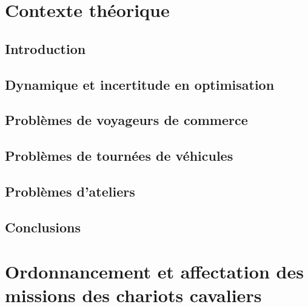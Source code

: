 \documentclass[
a4paper,
11pt,
twoside,
onecolumn,
openright,      %
leqno,          %
final   %
]{phdlasl}
\begin{document}
	\chapter{Contexte théorique}\label{chapitre:art}
	
	\section*{Introduction}\label{partie:art-introduction}
	
	
	\section{Dynamique et incertitude en optimisation}\label{partie:art-Incertitude}
	

	\section{Problèmes de voyageurs de commerce}\label{part:art-TSP}
	

	\section{Problèmes de tournées de véhicules}\label{partie:art-VRP}
	

	\section{Problèmes d'ateliers}\label{part:art-JSSP}
	

	\section*{Conclusions}\label{partie:art-conclusions}
	

	\chapter{Ordonnancement et affectation des missions des chariots cavaliers}\label{chapitre:ordo}
	
\end{document}
